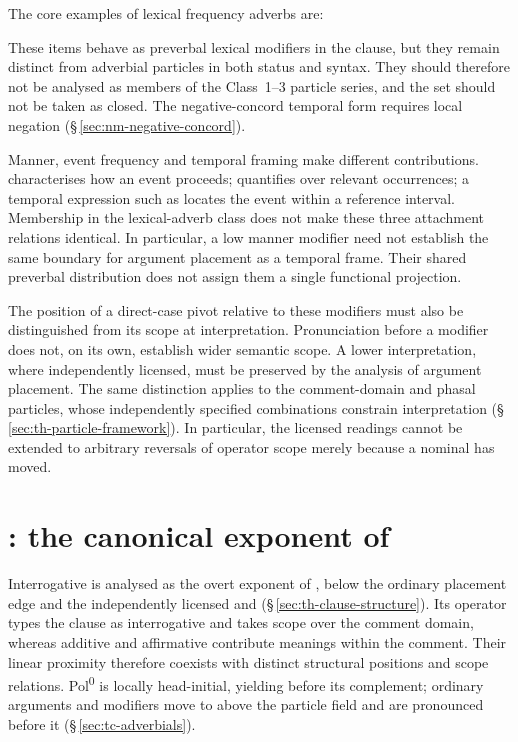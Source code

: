 The core examples of lexical frequency adverbs are:

\pex
\a {} 
\a {} 
\a {} 
\a {} 
\xe

\noindent These items behave as preverbal lexical modifiers in the clause, but
they remain distinct from adverbial particles in both status and syntax. They
should therefore not be analysed as members of the Class~1--3 particle series,
and the set should not be taken as closed. The negative-concord temporal
form   requires local negation
(§\,\ref{sec:nm-negative-concord}).

Manner, event frequency and temporal framing make different contributions.
 characterises how an event proceeds;  quantifies over
relevant occurrences; a temporal expression such as 
 locates the event within a reference interval. Membership
in the lexical-adverb class does not make these three attachment relations
identical. In particular, a low manner modifier need not establish the same
boundary for argument placement as a temporal frame. Their shared preverbal
distribution does not assign them a single functional projection.

The position of a direct-case pivot relative to these modifiers must also
be distinguished from its scope at interpretation. Pronunciation before a
modifier does not, on its own, establish wider semantic scope. A lower
interpretation, where independently licensed, must be preserved by the
analysis of argument placement. The same
distinction applies to the comment-domain and phasal particles, whose
independently specified combinations constrain interpretation
(§\,\ref{sec:th-particle-framework}). In particular, the licensed
 readings cannot be extended to arbitrary reversals of
operator scope merely because a nominal has moved.

\section{: the canonical exponent of \texorpdfstring{}{Pol0}}
\label{sec:by-pol-head}

Interrogative  is analysed as the overt exponent of
, below the ordinary placement edge
 and the independently licensed  and
 (§\,\ref{sec:th-clause-structure}). Its operator types the
clause as interrogative and takes scope over the comment domain, whereas
additive  and affirmative  contribute meanings within
the comment. Their linear proximity therefore coexists with distinct
structural positions and scope relations. Pol\textsuperscript{0} is
locally head-initial, yielding  before its complement; ordinary
arguments and modifiers move to  above the particle field
and are pronounced before it
(§\,\ref{sec:tc-adverbials}).

